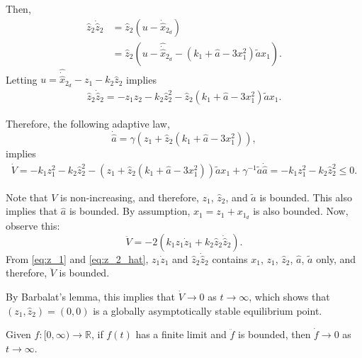 \documentclass{article}
\begin{document}
Then,
\begin{align}
  \label{eq:z_2_hat}
  \hat{z}_{2} \dot{\hat{z}}_{2} &= \hat{z}_{2} (u - \dot{\hat{x}}_{2_{d}})
  \\
                                &= \hat{z}_{2} (u - \hat{\dot{\hat{x}}}_{2_{d}} - (k_{1} + \hat{a} - 3x_{1}^{2})\tilde{a} x_{1}).
\end{align}
Letting $u = \hat{\dot{\hat{x}}}_{2_{d}} - z_{1} - k_{2}\hat{z}_{2}$ implies
\begin{align}
  \hat{z}_{2} \dot{\hat{z}}_{2} = -z_{1}\hat{z}_{2} -k_{2} \hat{z}_{2}^{2} - \hat{z}_{2} (k_{1} + \hat{a} - 3 x_{1}^{2}) \tilde{a} x_{1}.
\end{align}

Therefore,
the following adaptive law,
\begin{equation}
  \dot{\hat{a}} = \gamma (z_{1} + \hat{z}_{2}(k_{1} + \hat{a} - 3x_{1}^{2})),
\end{equation}
implies
\begin{align}
  \dot{V} = -k_{1}z_{1}^{2} - k_{2} \hat{z}_{2}^{2} - (z_{1} + \hat{z}_{2}(k_{1} + \hat{a} - 3x_{1}^{2}) ) \tilde{a} x_{1} + \gamma^{-1} \tilde{a} \dot{\hat{a}}
  = -k_{1}z_{1}^{2} - k_{2} \hat{z}_{2}^{2} \leq 0.
\end{align}

Note that $V$ is non-increasing,
and therefore, $z_{1}$, $\hat{z}_{2}$, and $\tilde{a}$ is bounded.
This also implies that $\hat{a}$ is bounded.
By assumption, $x_{1} = z_{1} + x_{1_{d}}$ is also bounded.
Now, observe this:
\begin{equation}
  \ddot{V} = -2(k_{1} z_{1}\dot{z}_{1} + k_{2} \hat{z}_{2} \dot{\hat{z}}_{2}).
\end{equation}
From \eqref{eq:z_1} and \eqref{eq:z_2_hat},
$z_{1} \dot{z}_{1}$ and $\hat{z}_{2} \dot{\hat{z}}_{2}$ contains $x_{1}$, $z_{1}$, $\hat{z}_{2}$, $\hat{a}$, $\tilde{a}$ only,
and therefore, $\ddot{V}$ is bounded.

By Barbalat's lemma, this implies that $\dot{V} \to 0$ as $t \to \infty$, which shows that $(z_{1}, \hat{z}_{2}) = (0, 0)$ is a globally asymptotically stable equilibrium point.

\begin{theorem}
  Given $f: [0, \infty) \to \mathbb{R}$,
  if $f(t)$ has a finite limit and $\ddot{f}$ is bounded,
  then $\dot{f} \to 0$ as $t \to \infty$.
\end{theorem}

%
\end{document}
